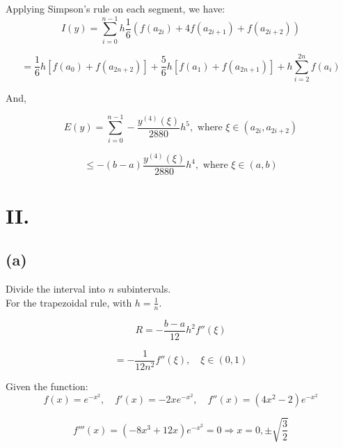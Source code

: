 \documentclass[a4paper]{article}
\begin{document}
Applying Simpson's rule on each segment, we have:
\begin{equation*}
I(y) = \sum_{i=0}^{n-1} h \frac{1}{6} \left( f(a_{2i}) + 4f(a_{2i+1}) + f(a_{2i+2}) \right)
\end{equation*}

\begin{equation*}
= \frac{1}{6} h \left[ f(a_0) + f(a_{2n+2}) \right] + \frac{5}{6} h \left[ f(a_1) + f(a_{2n+1}) \right] + h \sum_{i=2}^{2n} f(a_i)
\end{equation*}

And,

\begin{equation*}
E(y) = \sum_{i=0}^{n-1} -\frac{y^{(4)}(\xi)}{2880} h^5, \text{ where } \xi \in (a_{2i}, a_{2i+2})
\end{equation*}

\begin{equation*}
\leq -(b-a) \frac{y^{(4)}(\xi)}{2880} h^4, \text{ where } \xi \in (a, b)
\end{equation*}

\section*{II.}

\subsection*{(a)}

Divide the interval into $n$ subintervals.\\
For the trapezoidal rule, with $h = \frac{1}{n}$.

\begin{equation*}
R = -\frac{b-a}{12} h^2 f''\left(\xi\right)
\end{equation*}

\begin{equation*}
= -\frac{1}{12n^2} f''\left(\xi\right), \quad \xi \in (0,1)
\end{equation*}

Given the function:
\begin{equation*}
f(x) = e^{-x^2}, \quad f'(x) = -2x e^{-x^2}, \quad f''(x) = (4x^2 - 2) e^{-x^2}
\end{equation*}

\begin{equation*}
f'''(x) = (-8x^3 + 12x) e^{-x^2} = 0 \Rightarrow x = 0, \pm \sqrt{\frac{3}{2}}
\end{equation*}
\end{document}
